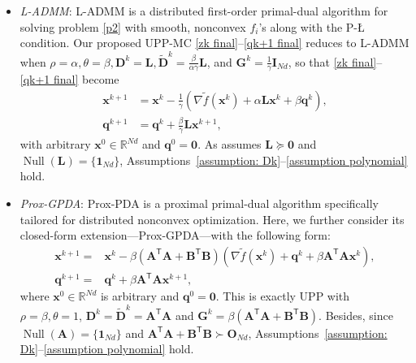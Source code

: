 \documentclass[12pt,draftcls,onecolumn]{IEEEtran}
\renewcommand{\Re}{{\mathbb{R}}}
\newcommand{\bx}{{\mathbf{x}}}
\newcommand{\bG}{{\mathbf{G}}}
\newcommand{\bL}{{\mathbf{L}}}
\newcommand{\bq}{{\mathbf{q}}}
\newcommand{\bI}{{\mathbf{I}}}
\newcommand{\bD}{{\mathbf{D}}}
\newcommand{\bW}{{\mathbf{W}}}
\begin{document}
\begin{itemize}
	
	\item[3)] \textit{L-ADMM}: L-ADMM \cite{yi2022sublinear} is a distributed first-order primal-dual algorithm for solving problem \eqref{p2} with smooth, nonconvex $f_i$'s along with the P-{\L} condition. Our proposed UPP-MC \eqref{zk final}--\eqref{qk+1 final} reduces to L-ADMM when $\rho = \alpha,\theta=\beta,\mathbf{D}^k=\mathbf{L},\tilde{\mathbf{D}}^k=\frac{\beta}{\alpha\gamma}\mathbf{L}$, and $\mathbf{G}^k=\frac{1}{\gamma}\mathbf{I}_{Nd}$, so that \eqref{zk final}--\eqref{qk+1 final} become
	\begin{align*}
		 \mathbf{x}^{k+1} &= \mathbf{x}^k - \frac{1}{\gamma}(\nabla \tilde{f}(\mathbf{x}^k) + \alpha \mathbf{L} \mathbf{x}^k + \beta\mathbf{q}^k), \\
		 \mathbf{q}^{k+1} &= \mathbf{q}^{k} + \frac{\beta}{\gamma}\mathbf{L}\mathbf{x}^{k+1},
	\end{align*}
    with arbitrary $\mathbf{x}^0 \in \Re^{Nd}$ and $\mathbf{q}^0=\mathbf{0}$. As \cite{yi2022sublinear} assumes $\bL \succeq \mathbf{0}$ and $\operatorname{Null}(\mathbf{L}) = \{\mathbf{1}_{Nd}\}$, Assumptions~\ref{assumption: Dk}--\ref{assumption polynomial} hold.

	\item[4)] \textit{Prox-GPDA}: Prox-PDA \cite{hong_prox-pda_2017} is a proximal primal-dual algorithm specifically tailored for distributed nonconvex optimization. Here, we further consider its closed-form extension—Prox-GPDA—with the following form:
    \begin{align*}
        \bx^{k+1}=&\bx^k-\beta(\mathbf{A}^{\mathsf{T}}\mathbf{A}+\mathbf{B}^{\mathsf{T}}\mathbf{B})(\nabla \tilde{f}(\bx^k)+\bq^k+\beta\mathbf{A}^{\mathsf{T}}\mathbf{A}\bx^k),\\
        \bq^{k+1}=&\bq^k+\beta \mathbf{A}^{\mathsf{T}}\mathbf{A}\bx^{k+1},
    \end{align*}
    where $\mathbf{x}^0 \in \Re^{Nd}$ is arbitrary and $\mathbf{q}^0=\mathbf{0}$. This is exactly UPP with $\rho=\beta, \theta=1$, $\bD^k=\tilde{\bD}^k=\mathbf{A}^{\mathsf{T}}\mathbf{A}$ and $\bG^k=\beta(\mathbf{A}^{\mathsf{T}}\mathbf{A}+\mathbf{B}^{\mathsf{T}}\mathbf{B})$. Besides, since $\operatorname{Null}(\mathbf{A})=\{\mathbf{1}_{Nd}\}$ and $\mathbf{A}^{\mathsf{T}}\mathbf{A}+\mathbf{B}^{\mathsf{T}}\mathbf{B}\succ \mathbf{O}_{Nd}$, Assumptions~\ref{assumption: Dk}--\ref{assumption polynomial} hold.


\end{itemize}
\end{document}
